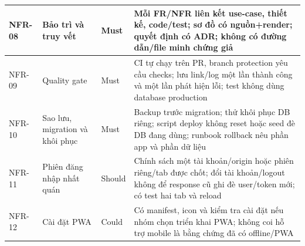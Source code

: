 \begin{longtable}{|>{\raggedright\arraybackslash}p{}|>{\raggedright\arraybackslash}p{}|>{\raggedright\arraybackslash}p{}|>{\raggedright\arraybackslash}p{}|}
NFR-08 & Bảo trì và truy vết & Must & Mỗi FR/NFR liên kết use-case, thiết kế, code/test; sơ đồ có nguồn+render; quyết định có ADR; không có đường dẫn/file minh chứng giả \\ \hline
NFR-09 & Quality gate & Must & CI tự chạy trên PR, branch protection yêu cầu checks; lưu link/log một lần thành công và một lần phát hiện lỗi; test không dùng database production \\ \hline
NFR-10 & Sao lưu, migration và khôi phục & Must & Backup trước migration; thử khôi phục DB riêng; script deploy không reset hoặc seed đè DB đang dùng; runbook rollback nêu phần app và phần dữ liệu \\ \hline
NFR-11 & Phiên đăng nhập nhất quán & Should & Chính sách một tài khoản/origin hoặc phiên riêng/tab được chốt; đổi tài khoản/logout không để response cũ ghi đè user/token mới; có test hai tab và reload \\ \hline
NFR-12 & Cài đặt PWA & Could & Có manifest, icon và kiểm tra cài đặt nếu nhóm chọn triển khai PWA; không coi hỗ trợ mobile là bằng chứng đã có offline/PWA \\ \hline
\end{longtable}
\endgroup
